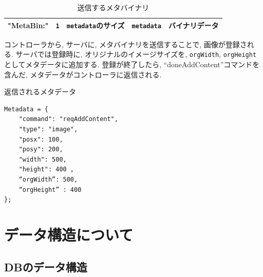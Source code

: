 \documentclass[a4paper,10pt,oneside]{jsbook}
\begin{document}
\begin{table}[htbp]
\begin{center}
\caption{送信するメタバイナリ}
\label{sendmetabin}
\begin{tabular}{|l|l|l|l|l|}
\hline
"MetaBin:" & \verb+1+ & \verb+metadata+のサイズ & \verb+metadata+ & バイナリデータ \\
\hline

\end{tabular}
\end{center}
\end{table}

コントローラから, サーバに, メタバイナリを送信することで, 画像が登録される. サーバでは登録時に,
オリジナルのイメージサイズを, \verb+orgWidth+, \verb+orgHeight+ としてメタデータに追加する. 
登録が終了したら, “doneAddContent”コマンドを含んだ, メタデータがコントローラに返信される. 

返信されるメタデータ

\begin{verbatim}
Metadata = {
    "command": "reqAddContent", 
    "type": "image", 
    "posx": 100, 
    "posy": 200, 
    "width": 500,
    "height": 400 ,
    “orgWidth”: 500,
    “orgHeight” : 400
};
\end{verbatim}


\chapter{データ構造について}

\section{DBのデータ構造}
\end{document}
